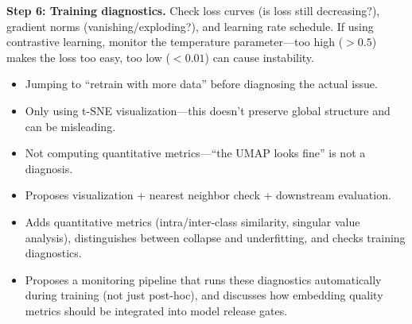 \begin{interviewq}
\textbf{Step 6: Training diagnostics.} Check loss curves (is loss still decreasing?), gradient norms (vanishing/exploding?), and learning rate schedule. If using contrastive learning, monitor the temperature parameter---too high ($>0.5$) makes the loss too easy, too low ($<0.01$) can cause instability.

\redflags
\begin{itemize}
    \item Jumping to ``retrain with more data'' before diagnosing the actual issue.
    \item Only using t-SNE visualization---this doesn't preserve global structure and can be misleading.
    \item Not computing quantitative metrics---``the UMAP looks fine'' is not a diagnosis.
\end{itemize}


\goodgreat
\begin{itemize}
    \item {} Proposes visualization + nearest neighbor check + downstream evaluation.
    \item {} Adds quantitative metrics (intra/inter-class similarity, singular value analysis), distinguishes between collapse and underfitting, and checks training diagnostics.
    \item {} Proposes a monitoring pipeline that runs these diagnostics automatically during training (not just post-hoc), and discusses how embedding quality metrics should be integrated into model release gates.
\end{itemize}

\end{interviewq}
